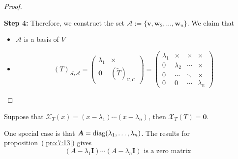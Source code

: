 \begin{proof}
\begin{enumerate}
\textbf{Step 4:}
Therefore, we construct the set $\mathcal{A}:=
\{\bm v,\bm w_2,\dots,\bm w_n\}$.
We claim that 
\begin{itemize}
\item
$\mathcal{A}$ is a basis of $V$
\item
\[
(T)_{\mathcal{A},\mathcal{A}}=\begin{pmatrix}
\lambda_1&\times\\\bm0&(\tilde{T})_{\overline{\mathcal{C}},\overline{\mathcal{C}}}
\end{pmatrix}=\begin{pmatrix}
\lambda_1&\times&\times&\times\\
0&\lambda_2&\cdots&\times\\
0&\cdots&\ddots&\times\\
0&0&\cdots&\lambda_n
\end{pmatrix}
\]
\end{itemize}
\end{enumerate}
\end{proof}

\begin{proposition}\label{pro:7:13}
Suppose that $\mathcal{X}_T(x) = (x-\lambda_1)\cdots(x-\lambda_n)$, then $\mathcal{X}_T(T)=\bm0$.
\end{proposition}
\begin{remark}
One special case is that $\bm A = \operatorname{diag}(\lambda_1,\dots,\lambda_n)$.
The results for proposition~(\ref{pro:7:13}) gives
\[
(A-\lambda_1\bm I)\cdots(A-\lambda_n\bm I)\text{ is a zero matrix}
\]
\end{remark}

















